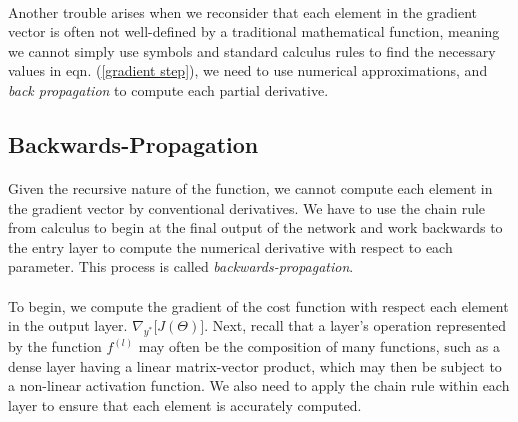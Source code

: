 \documentclass[12pt,letterpaper]{article}
\begin{document}
\paragraph*{}Another trouble arises when we reconsider that each element in the gradient vector is often not well-defined by a traditional mathematical function, meaning we cannot simply use symbols and standard calculus rules to find the necessary values in eqn. (\ref{gradient step}), we need to use numerical approximations, and \textit{back propagation} to compute each partial derivative. 


\subsection{Backwards-Propagation}

\paragraph*{}Given the recursive nature of the function, we cannot compute each element in the gradient vector by conventional derivatives. We have to use the chain rule from calculus to  begin at the final output of the network and work backwards to the entry layer to compute the numerical derivative with respect to each parameter. This process is called \textit{backwards-propagation}. 

\paragraph*{}To begin, we compute the gradient of the cost function with respect each element in the output layer. $\nabla_{y^*}\big[J(\Theta)\big]$. Next, recall that a layer's operation represented by the function $f^{(l)}$ may often be the composition of many functions, such as a dense layer having a linear matrix-vector product, which may then be subject to a non-linear activation function. We also need to apply the chain rule within each layer to ensure that each element is accurately computed.
\end{document}
